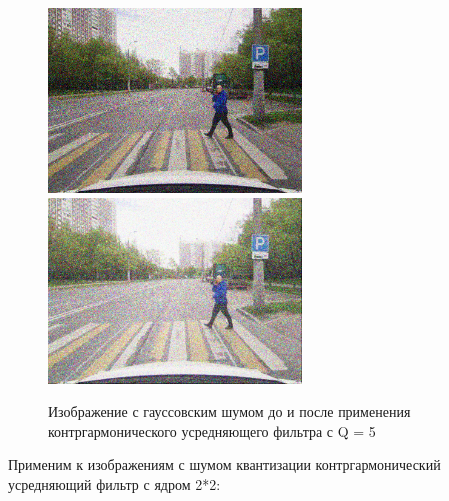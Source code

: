 \begin{figure}[hbt!]
    \centering
    \includegraphics[width=0.6\textwidth]{../outputs/image_gauss_noise.png}
    \includegraphics[width=0.6\textwidth]{../addition/image_gauss_countergarmonic_filter_Q5.png}
    \caption{Изображение с гауссовским шумом до и после применения контргармонического усредняющего фильтра с Q = 5}
    \label{fig:stich_images}
\end{figure}

\pagebreak
Применим к изображениям с шумом квантизации контргармонический усредняющий фильтр с ядром 2*2:


